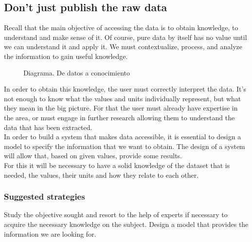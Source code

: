 \subsection{Don't just publish the raw data}

Recall that the main objective of accessing the data is to obtain knowledge, to understand and make sense of it. Of course, 
pure data by itself has no value until we can understand it and apply it. We must contextualize, process, and analyze the 
information to gain useful knowledge. \\
    
\begin{figure}[ht]
    \centering 
    \caption{Diagrama. De datos a conocimiento}
\end{figure}
 
In order to obtain this knowledge, the user must correctly interpret the data. It's not enough to know what the values and 
units individually represent, but what they mean in the big picture. For that the user must already have expertise in the 
area, or must engage in further research allowing them to understand the data that has been extracted.\\
    
In order to build a system that makes data accessible, it is essential to design a model to specify the
information that we want to obtain. The design of a system will allow that, based on given values, provide some results.\\

For this it will be necessary to have a solid knowledge of the dataset that is needed, the values, their units and how they relate to each other.

\subsubsection*{Suggested strategies} 

Study the objective sought and resort to the help of experts if necessary to acquire the necessary knowledge
on the subject. Design a model that provides the information we are looking for.

